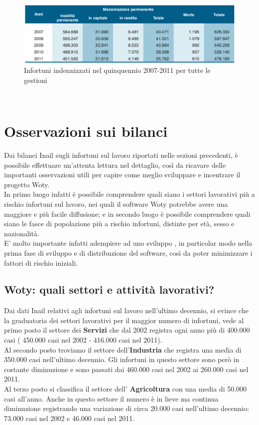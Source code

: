 \begin{figure}[H]
\centering
\includegraphics[scale=0.55]{images/cap4/analisiDiMercato/infortuniIndennizzi2}
\caption{Infortuni indennizzati nel quinquennio 2007-2011 per tutte le gestioni}
\end{figure}




\ \ \
\section{Osservazioni sui bilanci}
Dai bilanci Inail sugli infortuni sul lavoro riportati nelle sezioni precedenti, è possibile effettuare un'attenta lettura nel dettaglio, così da ricavare delle importanti osservazioni utili per capire come meglio sviluppare e incentrare il progetto Woty.\\
In primo luogo infatti è possibile comprendere quali siano i settori lavorativi più a rischio infortuni sul lavoro, nei quali il software Woty potrebbe avere una maggiore e più facile diffusione; e in secondo luogo è possibile comprendere quali siano le fasce di popolazione più a rischio infortuni, distinte per età, sesso e nazionalità.\\
E' molto importante infatti adempiere ad uno sviluppo \virgolette{mirato}, in particolar modo nella prima fase di sviluppo e di distribuzione del software, così da poter minimizzare i fattori di rischio iniziali.\\


\subsection{Woty: quali settori e attività lavorativi?}
Dai dati Inail relativi agli infortuni sul lavoro nell'ultimo decennio, si evince che la graduatoria dei settori lavorativi per il maggior numero di infortuni, vede al primo posto il settore dei \textbf{Servizi} che dal 2002 registra ogni anno più di 400.000 casi ( 450.000 casi nel 2002 - 416.000 casi nel 2011).\\
Al secondo posto troviamo il settore dell'\textbf{Industria} che registra una media di 350.000 casi nell'ultimo decennio. Gli infortuni in questo settore sono però in costante diminuzione e sono passati dai 460.000 casi nel 2002 ai 260.000 casi nel 2011.\\
Al terzo posto si classifica il settore dell' \textbf{Agricoltura} con una media di 50.000 casi all'anno. Anche in questo settore il numero è in lieve ma continua diminuzione registrando una variazione di circa 20.000 casi nell'ultimo decennio: 73.000 casi nel 2002 e 46.000 casi nel 2011.\\

